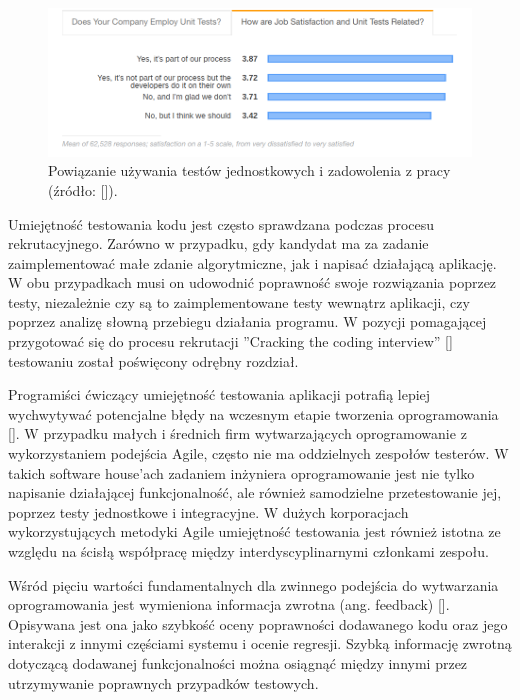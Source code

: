 \begin{figure}[h]
    \centering
    \includegraphics[width = 13cm]{chapter01/unit-tests-satisfaction.png}
    \caption{Powiązanie używania testów jednostkowych i zadowolenia z pracy (źródło: []).}
    \label{fig:unit-tests-satisfaction}
\end{figure}

Umiejętność testowania kodu jest często sprawdzana podczas procesu rekrutacyjnego.
Zarówno w przypadku, gdy kandydat ma za zadanie zaimplementować małe zdanie algorytmiczne, jak i napisać działającą aplikację.
W obu przypadkach musi on udowodnić poprawność swoje rozwiązania poprzez testy, niezależnie czy są to zaimplementowane testy wewnątrz aplikacji, czy poprzez analizę słowną przebiegu działania programu.
W pozycji pomagającej przygotować się do procesu rekrutacji ”Cracking the coding interview” [] testowaniu został poświęcony odrębny rozdział.

Programiści ćwiczący umiejętność testowania aplikacji potrafią lepiej wychwytywać potencjalne błędy na wczesnym etapie tworzenia oprogramowania [].
W przypadku małych i średnich firm wytwarzających oprogramowanie z wykorzystaniem podejścia Agile, często nie ma oddzielnych zespołów testerów.
W takich software house'ach zadaniem inżyniera oprogramowanie jest nie tylko napisanie działającej funkcjonalność, ale również samodzielne przetestowanie jej, poprzez testy jednostkowe i integracyjne.
W dużych korporacjach wykorzystujących metodyki Agile umiejętność testowania jest również istotna ze względu na ścisłą współpracę między interdyscyplinarnymi członkami zespołu.

Wśród pięciu wartości fundamentalnych dla zwinnego podejścia do wytwarzania oprogramowania jest wymieniona informacja zwrotna (ang. feedback) [].
Opisywana jest ona jako szybkość oceny poprawności dodawanego kodu oraz jego interakcji z innymi częściami systemu i ocenie regresji.
Szybką informację zwrotną dotyczącą dodawanej funkcjonalności można osiągnąć między innymi przez utrzymywanie poprawnych przypadków testowych.

